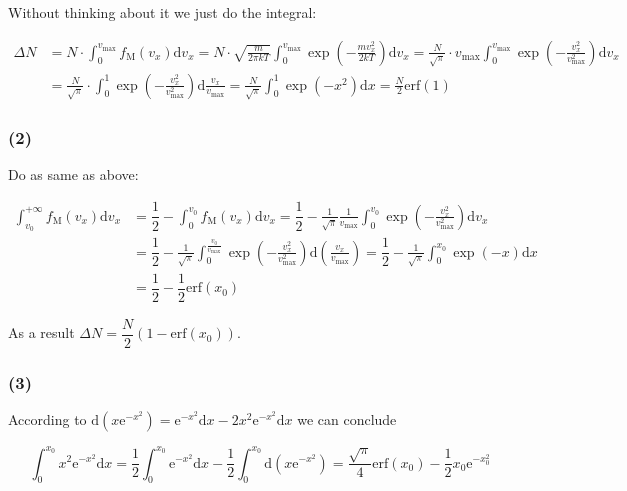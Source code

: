 \documentclass[a4paper,11pt]{amsart}
\theoremstyle{definition}
\begin{document}
	Without thinking about it we just do the integral:
	
	\begin{align}
		\Delta N&=N\cdot \int_{0}^{v_{\max}}{f_{\mathrm{M}}\left( v_x \right) \mathrm{d}v_x=}N\cdot \sqrt{\frac{m}{2\pi kT}}\int_0^{v_{\max}}{\exp \left( -\frac{mv_{x}^{2}}{2kT} \right) \mathrm{d}v_x}=\frac{N}{\sqrt{\pi}}\cdot v_{\max}\int_0^{v_{\max}}{\exp \left( -\frac{v_{x}^{2}}{v_{\max}^{2}} \right) \mathrm{d}v_x}\\
		&=\frac{N}{\sqrt{\pi}}\cdot \int_0^1{\exp \left( -\frac{v_{x}^{2}}{v_{\max}^{2}} \right) \mathrm{d}\frac{v_x}{v_{\max}}}=\frac{N}{\sqrt{\pi}}\int_0^1{\exp \left( -x^2 \right) \mathrm{d}x}=\frac{N}{2}\mathrm{erf}\left( 1 \right) 
	\end{align}
	
	\subsubsection*{(2)}
	
	Do as same as above:
	
	\begin{align}
		\int_{v_0}^{+\infty}{f_{\mathrm{M}}\left( v_x \right) \mathrm{d}v_x}&=\dfrac{1}{2}-\int_0^{v_0}{f_{\mathrm{M}}\left( v_x \right) \mathrm{d}v_x}=\dfrac{1}{2}-\frac{1}{\sqrt{\pi}}\frac{1}{v_{\max}}\int_0^{v_0}{\exp \left( -\frac{v_{x}^{2}}{v_{\max}^{2}} \right) \mathrm{d}v_x}\\
		&=\dfrac{1}{2}-\frac{1}{\sqrt{\pi}}\int_0^{\frac{v_0}{v_{\max}}}{\exp \left( -\frac{v_{x}^{2}}{v_{\max}^{2}} \right) \mathrm{d}\left( \frac{v_x}{v_{\max}} \right)}=\dfrac{1}{2}-\frac{1}{\sqrt{\pi}}\int_0^{x_0}{\exp \left( -x \right) \mathrm{d}x}\\
		&=\dfrac{1}{2}-\dfrac{1}{2}\mathrm{erf}\left( x_0 \right) 
	\end{align}
	
	As a result $\displaystyle \Delta N=\dfrac{N}{2}(1-\mathrm{erf}(x_0))$.
	
	\subsubsection*{(3)}
	
	According to $\displaystyle\mathrm{d}\left( x\mathrm{e}^{-x^2} \right) =\mathrm{e}^{-x^2}\mathrm{d}x-2x^2\mathrm{e}^{-x^2}\mathrm{d}x$ we can conclude
	
	$$
	\int_0^{x_0}{x^2\mathrm{e}^{-x^2}\mathrm{d}x=\frac{1}{2}\int_0^{x_0}{\mathrm{e}^{-x^2}\mathrm{d}x-\frac{1}{2}\int_0^{x_0}{\mathrm{d}\left( x\mathrm{e}^{-x^2} \right) =}}}\frac{\sqrt{\pi}}{4}\mathrm{erf}\left( x_0 \right) -\frac{1}{2}x_0\mathrm{e}^{-x_{0}^{2}}	
	$$
	
\end{document}
